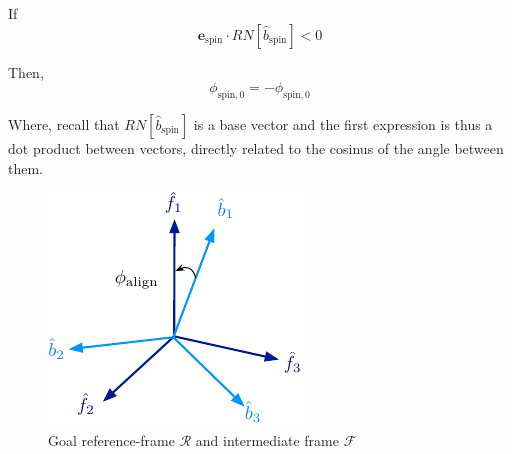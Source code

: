\documentclass[]{AVSSimReportMemo}
\begin{document}
If
$$\bm{e}_{\textrm{spin}} \cdot RN[\hat{b}_{\textrm{spin}}] < 0 $$

Then,
$$\phi_{\textrm{spin},0} = -\phi_{\textrm{spin}, 0}$$

Where, recall that $RN[\hat{b}_{\textrm{spin}}]$ is a base vector and the first expression is thus a dot product between vectors, directly related to the cosinus of the angle between them.

\begin{figure}[htb]
	\centerline{\includegraphics{Figures/Fig4}}
	\caption{Goal reference-frame $\mathcal{R}$  and intermediate frame $\mathcal{F}$ }
	\label{fig:Fig4}
\end{figure} 




\end{document}
